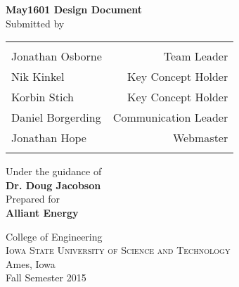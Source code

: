 \begin{titlepage}

\begin{center}

\Huge \textbf {May1601 Design Document}\\[0.5in]

\normalsize Submitted by \\
\begin{table}[h]
\centering
\begin{tabular}{lr}\hline \\
Jonathan Osborne & Team Leader \\
Nik Kinkel & Key Concept Holder \\ 
Korbin Stich & Key Concept Holder \\ 
Daniel Borgerding & Communication Leader \\
Jonathan Hope & Webmaster \\
\\ \hline
\end{tabular}
\end{table}

\vspace{.1in}
Under the guidance of\\
{\textbf{Dr. Doug Jacobson}}\\[0.2in]

\vspace{.1in}
Prepared for\\
{\textbf{Alliant Energy}}\\[0.2in]

\vfill

\Large{College of Engineering}\\
\normalsize
\textsc{Iowa State University of Science and Technology}\\
Ames, Iowa \\
\vspace{0.2cm}
Fall Semester 2015

\end{center}

\end{titlepage}
